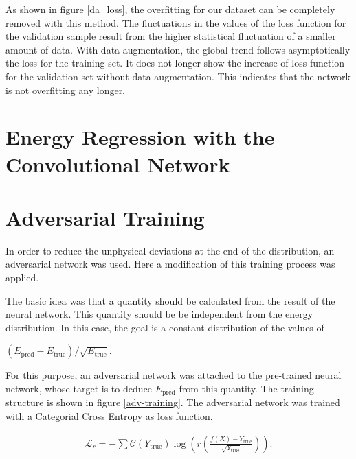 \documentclass[12pt, a4paper]{thesis}
\begin{document}
As shown in figure \ref{da_loss}, the overfitting for our dataset can
be completely removed with this method.  The fluctuations in the
values of the loss function for the validation sample result from the
higher statistical fluctuation of a smaller amount of data. With data
augmentation, the global trend follows asymptotically the loss for the
training set. It does not longer show the increase of loss function
for the validation set without data augmentation. This indicates that
the network is not overfitting any longer.

\section{Energy Regression with the Convolutional Network}


\section{Adversarial Training}
\label{sec:org30a0273}


In order to reduce the unphysical deviations at the end of the
distribution, an adversarial network was used. Here a modification of
this training process was applied.

The basic idea was that a quantity should be calculated from the
result of the neural network. This quantity should be be independent
from the energy distribution. In this case, the goal is a constant
distribution of the values of

\((E_{\text{pred}}-E_{\text{true}})/\sqrt{E_{\text{true}}}\).


For this purpose, an adversarial network was attached to the
pre-trained neural network, whose target is to deduce
\(E_{\text{pred}}\) from this quantity. The training structure is shown
in figure \ref{adv-training}. The adversarial network was trained
with a Categorial Cross Entropy as loss function.

\begin{align}
\mathcal{L}_r = - \sum \mathcal{C}\left(Y_{\text{true}}\right)
\log(r\left(\frac{f(X)-Y_{\text{true}}}{\sqrt{Y_{\text{true}}}}\right)).
\end{align}
\end{document}
